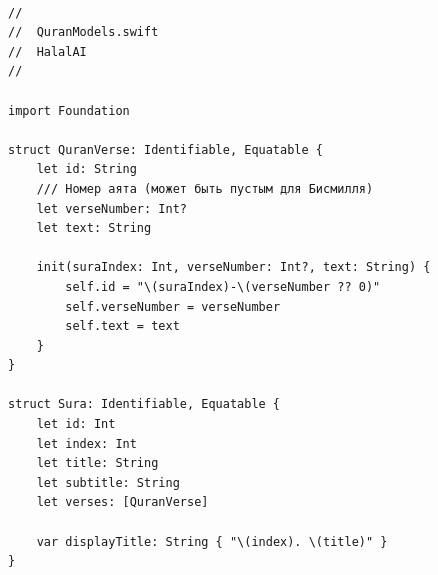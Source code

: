 \begin{lstlisting}[basicstyle=\tiny\ttfamily,breaklines=true]

//
//  QuranModels.swift
//  HalalAI
//

import Foundation

struct QuranVerse: Identifiable, Equatable {
    let id: String
    /// Номер аята (может быть пустым для Бисмилля)
    let verseNumber: Int?
    let text: String

    init(suraIndex: Int, verseNumber: Int?, text: String) {
        self.id = "\(suraIndex)-\(verseNumber ?? 0)"
        self.verseNumber = verseNumber
        self.text = text
    }
}

struct Sura: Identifiable, Equatable {
    let id: Int
    let index: Int
    let title: String
    let subtitle: String
    let verses: [QuranVerse]

    var displayTitle: String { "\(index). \(title)" }
}
\end{lstlisting}


